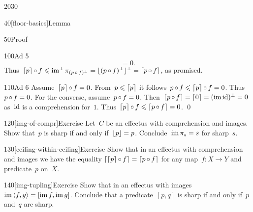 \begin{parsec}{2030}
\begin{point}{40}[floor-basics]{Lemma}
\begin{point}{50}{Proof}
\begin{point}{100}{Ad 5}
\begin{equation*}
    = 0.
\end{equation*}
Thus~$\left\lceil p\right\rceil \mathop{\circ} f \leqslant \operatorname{im^\perp} \pi_{(p \mathop{\circ} f)^\perp}
= \lfloor(p \mathop{\circ} f)^\perp\rfloor^\perp = \left\lceil p \mathop{\circ} f\right\rceil$, as promised.
\end{point}
\begin{point}{110}{Ad 6}%
Assume~$\left\lceil p\right\rceil\mathop{\circ} f = 0$.
From~$p \leqslant \left\lceil p\right\rceil$
it follows~$p \mathop{\circ} f \leqslant \left\lceil p\right\rceil \mathop{\circ} f = 0$.
Thus~$p \mathop{\circ} f = 0$.
For the converse, assume~$p \mathop{\circ} f = 0$.
Then~$\left\lceil p \mathop{\circ} f\right\rceil = \left\lceil0\right\rceil = (\operatorname{im} \mathrm{id})^\perp = 0$
    as~$\mathrm{id}$ is a comprehension for~$1$.
    Thus~$\left\lceil p\right\rceil \mathop{\circ} f \leqslant \left\lceil p \mathop{\circ} f\right\rceil = 0$. \qed
\end{point}
\end{point}
\end{point}
\begin{point}{120}[img-of-compr]{Exercise}%
Let~$C$ be an effectus with comprehension and images.
Show that~$p$ is sharp if and only if~$\left\lfloor p\right\rfloor= p$.
Conclude~$\operatorname{im} \pi_s = s$ for sharp~$s$.
\end{point}
\begin{point}{130}[ceiling-within-ceiling]{Exercise}%
Show that in an effectus with comprehension and images
    we have the equality
    $\left\lceil\left\lceil p\right\rceil\mathop{\circ} f\right\rceil = \left\lceil p \mathop{\circ} f\right\rceil$
    for any map~$f\colon X \to Y$ and predicate~$p$ on~$X$.
\end{point}
\begin{point}{140}[img-tupling]{Exercise}%
Show that in an effectus with
images~$\operatorname{im} \left<f,g \right> = [\operatorname{im} f, \operatorname{im} g]$.
Conclude that a predicate~$[p,q]$ is sharp
    if and only if~$p$ and~$q$ are sharp.
\end{point}
\end{parsec}

